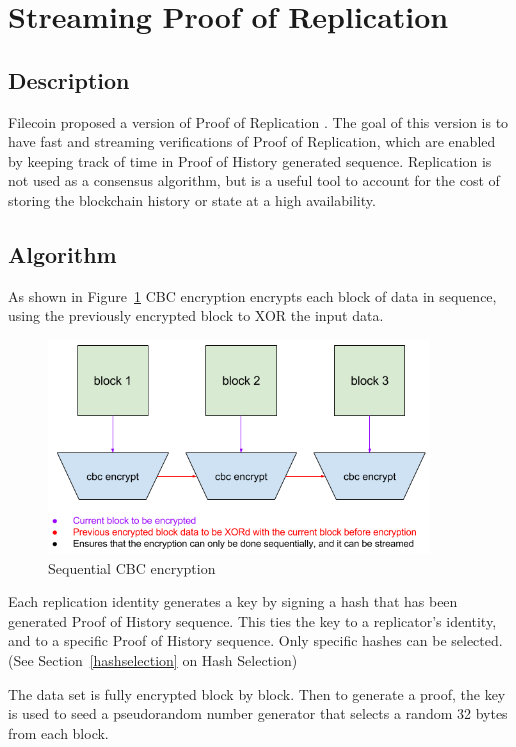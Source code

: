 \documentclass[12pt]{article}
\begin{document}
\section{Streaming Proof of Replication}\label{porep}
\subsection{Description}
Filecoin proposed a version of Proof of Replication \cite{filecoinporep}. The goal of this version is to have fast and streaming verifications of Proof of Replication, which are enabled by keeping track of time in Proof of History generated sequence. Replication is not used as a consensus algorithm, but is a useful tool to account for the cost of storing the blockchain history or state at a high availability.
\subsection{Algorithm}
As shown in Figure~\ref{fig:encrypt} CBC encryption encrypts each block of data in sequence, using the previously encrypted block to XOR the input data.

\begin{figure}[h]
  \begin{center}
    \centering
    \includegraphics[width=0.9\textwidth]{figures/cbc_encryption_001.png}
    \caption[Fig 7]{Sequential CBC encryption\label{fig:encrypt}}
  \end{center}
  \end{figure}

Each replication identity generates a key by signing a hash that has been generated Proof of History sequence. This ties the key to a replicator’s identity, and to a specific Proof of History sequence. Only specific hashes can be selected. (See Section~\ref{hashselection} on Hash Selection)

The data set is fully encrypted block by block. Then to generate a proof, the key is used to seed a pseudorandom number generator that selects a random 32 bytes from each block.
\end{document}
